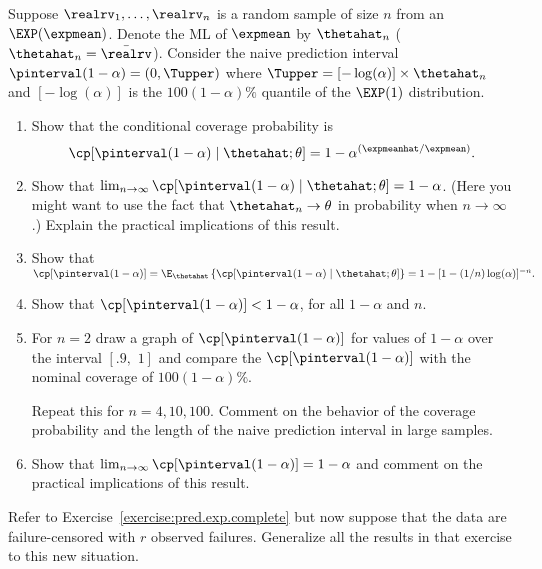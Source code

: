 \begin{exercise1}
\label{exercise:pred.exp.complete}
Suppose $\realrv_{1}, \dots, \realrv_{n}$ is a random sample of size
$n$ from an $\EXP(\expmean)$.  Denote the ML of $\expmean$ by
$\thetahat_{n}$ ( $\thetahat_{n}=\bar{\realrv}$).  Consider the naive
prediction interval $\pinterval(1-\alpha)= (0, \Tupper)$ where
$\Tupper= [-\log(\alpha)] \times \thetahat_{n}$ and $[-\log(\alpha)]$
is the $100(1-\alpha)\%$ quantile of the $\EXP(1)$ distribution.
\begin{enumerate}
\item
Show that the conditional coverage probability is
$$\cp[\pinterval(1-\alpha) \mid \thetahat ; \theta]
=1-\alpha^{(\expmeanhat/\expmean)}.  $$
\item
Show that $\lim_{n \to \infty}
\cp[\pinterval(1-\alpha) \mid \thetahat ; \theta]=1-\alpha$. (Here
you might want to use the fact that $\thetahat_{n} \to \theta$ in
probability when $n \to \infty$.)  Explain the practical implications
of this result.
\item
Show that $\cp[\pinterval(1-\alpha)]=
\E_{\thetahat} \left \{
 \cp[\pinterval(1-\alpha) \mid \thetahat ; \theta] \right \}
=1-[1-(1/n)\log(\alpha)]^{-n}.  $
\item
Show that 
$\cp[\pinterval(1-\alpha)] < 1-\alpha$, for  all $1-\alpha$ and $n$.
\item
For $n=2$ draw a graph of $\cp[\pinterval(1-\alpha)]$ for values of
$1-\alpha$ over the interval $[.9,\,\, 1]$ and compare the
$\cp[\pinterval(1-\alpha)]$ with the nominal coverage of
$100(1-\alpha)\%$.

Repeat this for $n=4, 10, 100$.  Comment on the behavior of the
coverage probability and the length of the naive prediction interval
in large samples.
\item
Show that $\lim_{n\to \infty}\cp[\pinterval(1-\alpha)]=1-\alpha$ and
comment on the practical implications of this result.
\end{enumerate}
\end{exercise1}

\begin{exercise1}
Refer to Exercise~\ref{exercise:pred.exp.complete} but now suppose
that the data are failure-censored with $r$ observed failures.
Generalize all the results in that exercise to this new situation.
\end{exercise1}

